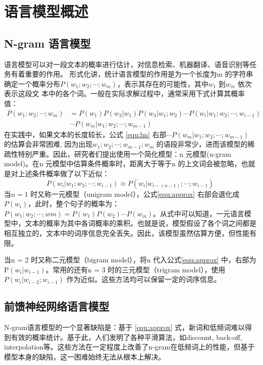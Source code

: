 \documentclass[12pt,a4paper]{article}
\begin{document}
\section{语言模型概述}

\subsection{N-gram 语言模型}
语言模型可以对一段文本的概率进行估计，对信息检索\cite{Jin:2002:TLM:564376.564386}、机器翻译\cite{DBLP:conf/naacl/BaltescuB15}、语音识别等任务有着重要的作用。
形式化讲，统计语言模型的作用是为一个长度为m 的字符串确定一个概率分布$P(w_1;w_2;\cdots;w_m)$，表示其存在的可能性，其中$w_1$ 到$w_m$ 依次表示这段文
本中的各个词。一般在实际求解过程中，通常采用下式计算其概率值：
\begin{equation}
\label{equ:lm}
\begin{split}
P(w_1;w_2; \cdots;w_m) &= P(w_1) P(w_2|w_1) P(w_3|w_1;w_2)\cdots P(w_i | w_1;w_2;\cdots;w_{i-1}) \\
&\cdots P(w_m | w_1;w_2;\cdots;w_{m-1})
\end{split}
\end{equation}
在实践中，如果文本的长度较长，公式 \ref{equ:lm} 右部$\cdots P(w_m | w_1;w_2;\cdots;w_{m-1}) $  的估算会非常困难, 因为出现$w_1;w_2;\cdots;w_{m-1};w_{m}$ 的语段非常少，进而该模型的稀疏性特别严重。因此，研究者们提出使用一个简化模型：n 元模型(n-gram model)。在n 元模型中估算条件概率时，距离大于等于n 的上文词会被忽略，也就是对上述条件概率做了以下近似：
\begin{equation}
\label{equ:approx}
P(w_i | w_1;w_2;\cdots;w_{i-1})  \approx P(w_i | w_{i-(n-1)};\cdots;w_{i-1})
\end{equation}
当$n = 1$ 时又称一元模型（unigram model），公式\ref{equ:approx} 右部会退化成$P(w_i)$，此时，整个句子的概率为：$P(w_1;w_2; \cdots;wm) = P(w_1)P(w_2) \cdots P(w_m)$。从式中可以知道，一元语言模型中，文本的概率为其中各词概率的乘积。也就是说，模型假设了各个词之间都是相互独立的，文本中的词序信息完全丢失。因此，该模型虽然估算方便，但性能有限。

当n = 2 时又称二元模型（bigram model），将n 代入公式\ref{equ:approx} 中，右部为P$(w_i|w_{i-1})$。常用的还有n = 3 时的三元模型（trigram model），使用$P(w_i |w_{i-2};w_{i-1})$ 作为近似。这些方法均可以保留一定的词序信息。

\subsection{前馈神经网络语言模型}
N-gram语言模型的一个显著缺陷是：基于 \ref{equ:approx} 式，新词和低频词难以得到有效的概率统计。基于此，人们发明了各种平滑算法，如discount, back-off, interpolation等。这些方法在一定程度上改善了n-gram在低频词上的性能，但基于模型本身的缺陷，这一困难始终无法从根本上解决。
\end{document}
